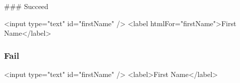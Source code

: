 \#\#\# Succeed 
\begin{DoxyCode}
<input type="text" id="firstName" />
<label htmlFor="firstName">First Name</label>
\end{DoxyCode}


\subsubsection*{Fail}


\begin{DoxyCode}
<input type="text" id="firstName" />
<label>First Name</label>
\end{DoxyCode}
 